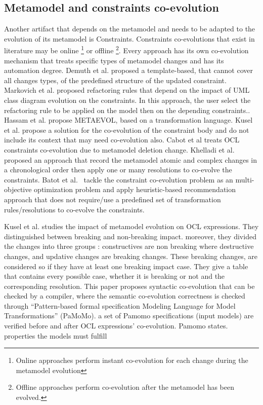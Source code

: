 \subsection{Metamodel and constraints co-evolution}
Another artifact that depends on the metamodel and needs to be adapted to the evolution of its metamodel is Constraints.
 Constraints co-evolutions that exist in literature may be online \footnote{Online approaches perform instant co-evolution for each change during the metamodel evolution} or offline \footnote{Offline approaches perform co-evolution after the metamodel has been evolved.}. Every approach has its own co-evolution mechanism that treats specific types of metamodel changes and has its automation degree. Demuth et al. \cite{10.1007/978-3-642-41533-3_18} proposed a template-based, that cannot cover all changes types, of the predefined structure of the updated constraint. Markovich et al. \cite{markovic2008refactoring} proposed refactoring rules that depend on the impact of UML class diagram evolution on the constraints. In this approach, the user select the refactoring rule to be applied on the model then on the depending constraints.. Hassam et al. \cite{hassam2011assistance} propose METAEVOL, based on a transformation language. Kusel et al. \cite{kusel2014systematic} propose a solution for the co-evolution of the constraint body and do not include its context that may need co-evolution also.
 Cabot et al \cite{cabot2004automatic} treats OCL constraints co-evolution due to metamodel deletion change. Khelladi et al. \cite{khelladi2017semi} proposed an approach that record the metamodel atomic and complex changes in a chronological order then apply one or many resolutions to co-evolve the constraints. Batot et al. \cite{8101267} tackle the constraint co-evolution problem as  an multi-objective optimization problem and apply heuristic-based recommendation approach that does not require/use a predefined set of transformation rules/resolutions to co-evolve the constraints.
 
 
 Kusel et al. \cite{kusel2014systematic}  studies the impact of metamodel evolution on OCL expressions. They distinguished between breaking and non-breaking impact. moreover, they divided the changes into three groups : constructives are non breaking where destructive changes, and updative changes are breaking changes. These breaking changes, are considered so if they have at least one breaking impact case. They give a table that contains every possible case, whether it is breaking or not and the corresponding resolution. This paper proposes syntactic co-evolution that can be checked by a compiler, where the semantic co-evolution correctness is checked through “Pattern-based formal specification Modeling Language for Model Transformations” (PaMoMo)\cite{10.1007/s10515-012-0102-y}. a set of Pamomo specifications (input models) are verified before and after OCL expressions' co-evolution. Pamomo states. properties the models must fulfill

